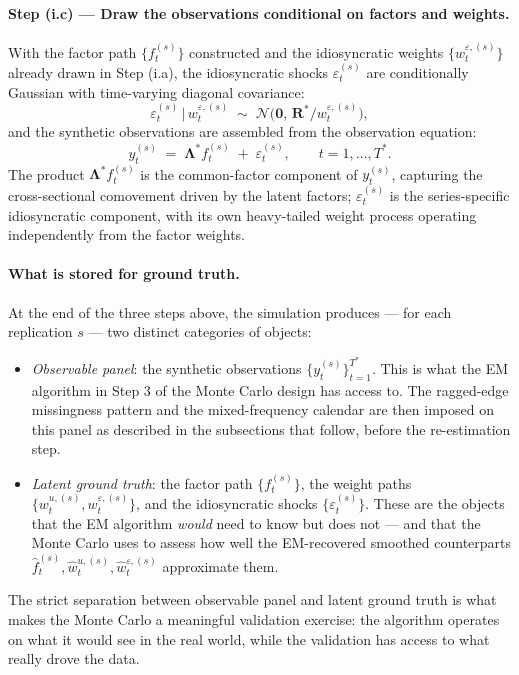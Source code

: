 \documentclass[11pt, a4paper, oneside]{article}
\newcommand{\mL}{\boldsymbol{\Lambda}}
\newcommand{\mR}{\mathbf{R}}
\begin{document}
\paragraph{Step (i.c) — Draw the observations conditional on factors and weights.}
With the factor path $\{f_t^{(s)}\}$ constructed and the
idiosyncratic weights $\{w_t^{\varepsilon, (s)}\}$ already drawn in
Step (i.a), the idiosyncratic shocks $\varepsilon_t^{(s)}$ are
conditionally Gaussian with time-varying diagonal covariance:
\[
\varepsilon_t^{(s)} \,\big|\, w_t^{\varepsilon, (s)} \;\sim\; \mathcal{N}\!\Big(\mathbf{0},\, \mR^* / w_t^{\varepsilon, (s)}\Big),
\]
and the synthetic observations are assembled from the observation
equation:
\[
y_t^{(s)} \;=\; \mL^* f_t^{(s)} \;+\; \varepsilon_t^{(s)}, \qquad t = 1, \ldots, T^*.
\]
The product $\mL^* f_t^{(s)}$ is the common-factor component of
$y_t^{(s)}$, capturing the cross-sectional comovement driven by
the latent factors; $\varepsilon_t^{(s)}$ is the series-specific
idiosyncratic component, with its own heavy-tailed weight process
operating independently from the factor weights.

\paragraph{What is stored for ground truth.}
At the end of the three steps above, the simulation produces — for
each replication $s$ — two distinct categories of objects:
\begin{itemize}[leftmargin=1.5em, itemsep=3pt]
    \item \emph{Observable panel}: the synthetic observations
          $\{y_t^{(s)}\}_{t=1}^{T^*}$. This is what the EM
          algorithm in Step 3 of the Monte Carlo design has access
          to. The ragged-edge missingness pattern and the
          mixed-frequency calendar are then imposed on this panel
          as described in the subsections that follow, before the
          re-estimation step.
    \item \emph{Latent ground truth}: the factor path
          $\{f_t^{(s)}\}$, the weight paths
          $\{w_t^{u, (s)}, w_t^{\varepsilon, (s)}\}$, and the
          idiosyncratic shocks $\{\varepsilon_t^{(s)}\}$. These
          are the objects that the EM algorithm \emph{would} need
          to know but does not — and that the Monte Carlo uses to
          assess how well the EM-recovered smoothed counterparts
          $\hat{f}_t^{(s)}, \hat{w}_t^{u, (s)},
          \hat{w}_t^{\varepsilon, (s)}$ approximate them.
\end{itemize}
The strict separation between observable panel and latent ground
truth is what makes the Monte Carlo a meaningful validation
exercise: the algorithm operates on what it would see in the real
world, while the validation has access to what really drove the
data.
\end{document}
